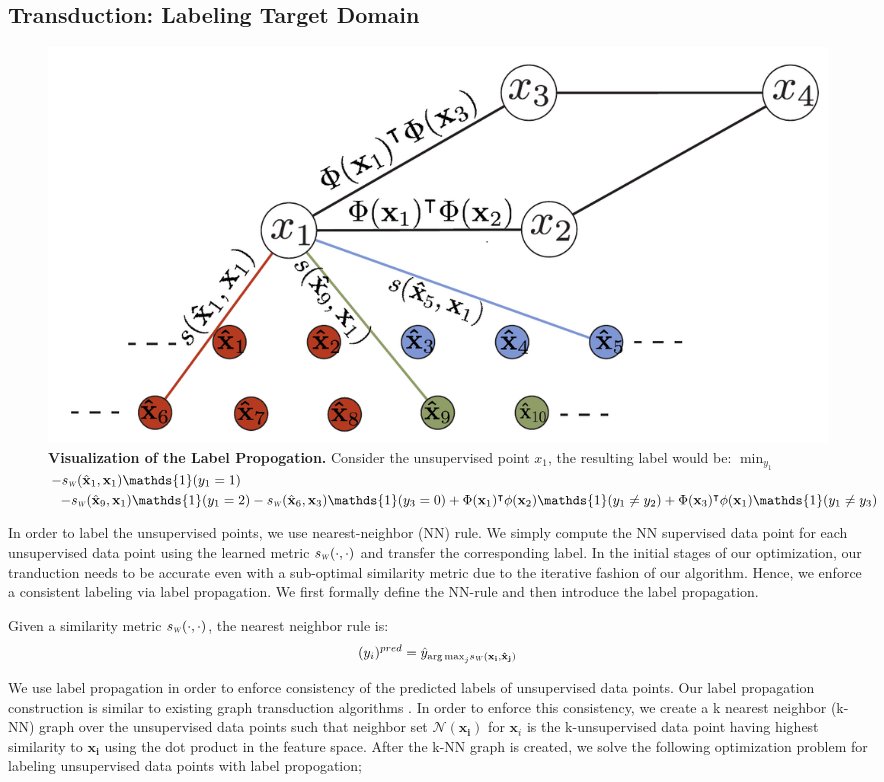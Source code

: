 \subsection{Transduction: Labeling Target Domain}
\label{label}
\begin{figure}[ht]
\includegraphics[width=\columnwidth]{figure3}
\caption{\textbf{Visualization of the Label Propogation.} Consider the unsupervised point $x_1$, the  resulting label would be: $\min_{y_1}$ \mbox{$-\sw(\hat{\mathbf{x}}_1,\mathbf{x}_1)\mathds{1}(y_1=1)$} $-\sw(\hat{\mathbf{x}}_{9},\mathbf{x}_1)\mathds{1}(y_1=2) -\sw(\hat{\mathbf{x}}_{6},\mathbf{x}_3)\mathds{1}(y_3=0) + \Phi(\mathbf{x}_1)^\intercal\phi(\mathbf{x}_2)\mathds{1}(y_1 \neq y_2) +\Phi(\mathbf{x}_3)^\intercal\phi(\mathbf{x}_1)\mathds{1}(y_1 \neq y_3)$}
\label{vis_label_prop}
\end{figure}
In order to label the unsupervised points, we use nearest-neighbor (NN) rule. We simply compute the NN supervised data point for each unsupervised data point using the learned metric $\sw(\cdot,\cdot)$ and transfer the corresponding label. In the initial stages of our optimization, our tranduction needs to be accurate even with a sub-optimal similarity metric due to the iterative fashion of our algorithm. Hence, we enforce a consistent labeling via label propagation. We first formally define the NN-rule and then introduce the label propagation.

Given a similarity metric $\sw(\cdot,\cdot)$, the nearest neighbor rule is:
\begin{equation}
(y_i)^{pred} = \hat{y}_{{\arg\max}_j \sw(\mathbf{x_i}, \mathbf{\hat{x}_j})}
\end{equation}

We use label propagation in order to enforce consistency of the predicted labels of unsupervised data points. Our label propagation construction is similar to existing graph transduction algorithms \cite{label_prop1,label_prop2}. In order to enforce this consistency, we create a k nearest neighbor (k-NN) graph over the unsupervised data points such that neighbor set $\mathcal{N}(\mathbf{x_i})$ for $\mathbf{x}_i$ is the k-unsupervised data point having highest similarity to $\mathbf{x_i}$ using the dot product in the feature space. After the k-NN graph is created, we solve the following optimization problem for labeling unsupervised data points with label propogation;

